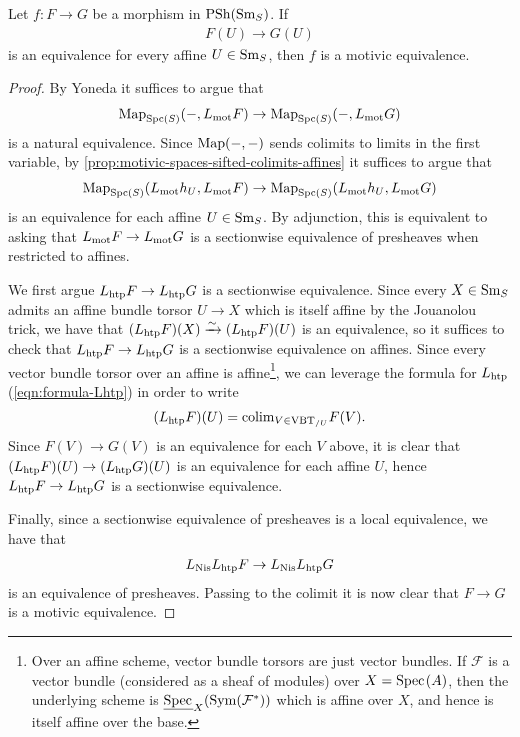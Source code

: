 \documentclass[11pt]{amsart}
\begin{document}
\begin{proposition} \cite[3.16]{Hoyois6} Let $f \colon F \to G$ be a morphism in $\mathrm{PSh}(\mathrm{Sm}_S)$. If
\begin{align*}
    F(U) \to G(U)
\end{align*}
is an equivalence for every affine $U\in \mathrm{Sm}_S$, then $f$ is a motivic equivalence.
\end{proposition}
\begin{proof} 


By Yoneda it suffices to argue that
\begin{align*}
    \mathrm{Map}_{\mathrm{Spc}(S)} (-,L_{\mathrm{mot}} F) \to \mathrm{Map}_{\mathrm{Spc}(S)} (-,L_{\mathrm{mot}} G)
\end{align*}
is a natural equivalence. Since $\mathrm{Map}(-,-)$ sends colimits to limits in the first variable, by \autoref{prop:motivic-spaces-sifted-colimits-affines} it suffices to argue that
\begin{align*}
    \mathrm{Map}_{\mathrm{Spc}(S)}(L_{\mathrm{mot}} h_U, L_{\mathrm{mot}} F) \to \mathrm{Map}_{\mathrm{Spc}(S)}(L_{\mathrm{mot}} h_U, L_{\mathrm{mot}} G)
\end{align*}
is an equivalence for each affine $U \in \mathrm{Sm}_S$. By adjunction, this is equivalent to asking that $L_{\mathrm{mot}} F \to L_{\mathrm{mot}} G$ is a sectionwise equivalence of presheaves when restricted to affines.

We first argue $L_{\mathrm{htp}} F \to L_{\mathrm{htp}} G$ is a sectionwise equivalence. Since every $X\in \mathrm{Sm}_S$ admits an affine bundle torsor $U \to X$ which is itself affine by the Jouanolou trick, we have that $(L_{\mathrm{htp}}F)(X) \xrightarrow{\sim} (L_{\mathrm{htp}} F)(U)$ is an equivalence, so it suffices to check that $L_{\mathrm{htp}} F \to L_{\mathrm{htp}} G$ is a sectionwise equivalence on affines. Since every vector bundle torsor over an affine is affine\footnote{%
Over an affine scheme, vector bundle torsors are just vector bundles. If $\mathscr{F}$ is a vector bundle (considered as a sheaf of modules) over $X = \text{Spec}\hspace{0.1em}(A)$, then the underlying scheme is $\underline{\text{Spec}\hspace{0.1em}}_X(\mathrm{Sym}(\mathcal{F}^\ast))$ which is affine over $X$, and hence is itself affine over the base.
}, we can leverage the formula for $L_{\mathrm{htp}}$ (\autoref{eqn:formula-Lhtp}) in order to write
\begin{align*}
    (L_{\mathrm{htp}} F)(U) = \mathrm{colim}_{V\in \text{VBT}_{/U}} F(V).
\end{align*}
Since $F(V) \to G(V)$ is an equivalence for each $V$ above, it is clear that $(L_{\mathrm{htp}} F)(U) \to (L_{\mathrm{htp}} G)(U)$ is an equivalence for each affine $U$, hence $L_{\mathrm{htp}} F \to L_{\mathrm{htp}} G$ is a sectionwise equivalence.

Finally, since a sectionwise equivalence of presheaves is a local equivalence, we have that
\begin{align*}
    L_{\mathrm{Nis}} L_{\mathrm{htp}} F \to L_{\mathrm{Nis}} L_{\mathrm{htp}} G
\end{align*}
is an equivalence of presheaves. Passing to the colimit it is now clear that $F \to G$ is a motivic equivalence.
\end{proof}
\end{document}
